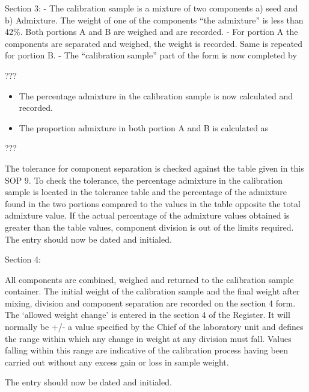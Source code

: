 \documentclass[]{book}
\providecommand{\tightlist}{%
  \setlength{\itemsep}{0pt}\setlength{\parskip}{0pt}}
\begin{document}
Section 3: - The calibration sample is a mixture of two components a)
seed and b) Admixture. The weight of one of the components ``the
admixture'' is less than 42\%. Both portions A and B are weighed and are
recorded. - For portion A the components are separated and weighed, the
weight is recorded. Same is repeated for portion B. - The ``calibration
sample'' part of the form is now completed by

???

\begin{itemize}
\tightlist
\item
  The percentage admixture in the calibration sample is now calculated
  and recorded.
\item
  The proportion admixture in both portion A and B is calculated as
\end{itemize}

???

The tolerance for component separation is checked against the table
given in this SOP 9. To check the tolerance, the percentage admixture in
the calibration sample is located in the tolerance table and the
percentage of the admixture found in the two portions compared to the
values in the table opposite the total admixture value. If the actual
percentage of the admixture values obtained is greater than the table
values, component division is out of the limits required. The entry
should now be dated and initialed.

Section 4:

All components are combined, weighed and returned to the calibration
sample container. The initial weight of the calibration sample and the
final weight after mixing, division and component separation are
recorded on the section 4 form. The `allowed weight change' is entered
in the section 4 of the Register. It will normally be +/- a value
specified by the Chief of the laboratory unit and defines the range
within which any change in weight at any division must fall. Values
falling within this range are indicative of the calibration process
having been carried out without any excess gain or loss in sample
weight.

The entry should now be dated and initialed.
\end{document}
